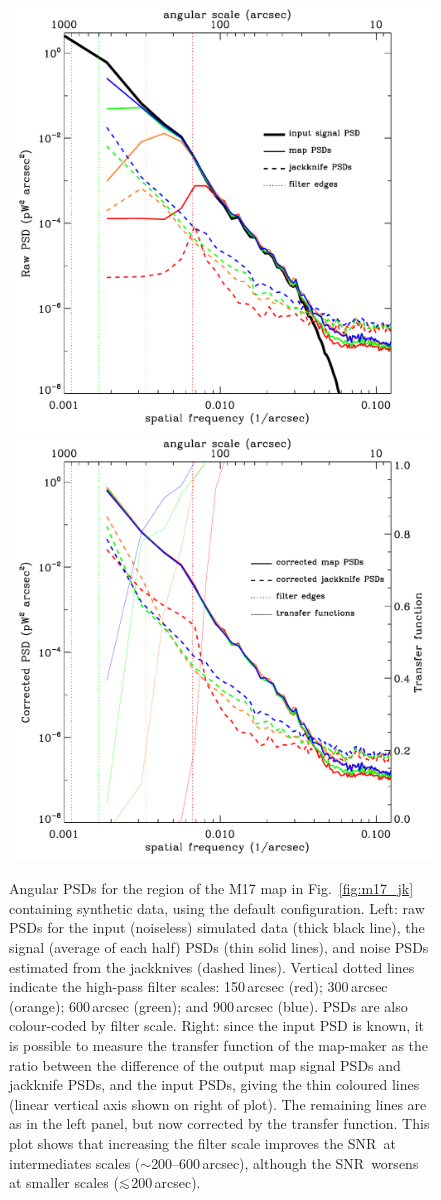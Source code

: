 \documentclass[useAMS,usenatbib,nofootinbib]{mn2e}
\newcommand{\snr}{SNR}
\def\lsim{\mathrel{\lower2.5pt\vbox{\lineskip=0pt\baselineskip=0pt
          \hbox{$<$}\hbox{$\sim$}}}}
\begin{document}
\begin{figure}
\centering
\includegraphics[width=0.49\linewidth]{pspec_m17_default}
\includegraphics[width=0.49\linewidth]{cor_pspec_m17_default}
\caption{Angular PSDs for the region of the M17 map in
Fig.~\ref{fig:m17_jk} containing synthetic data, using the default
configuration. Left: raw PSDs for the input (noiseless) simulated data
(thick black line), the signal (average of each half) PSDs (thin solid
lines), and noise PSDs estimated from the jackknives (dashed
lines). Vertical dotted lines indicate the high-pass filter scales:
150\,arcsec (red); 300\,arcsec (orange); 600\,arcsec (green); and
900\,arcsec (blue). PSDs are also colour-coded by filter scale. Right:
since the input PSD is known, it is possible to measure the transfer
function of the map-maker as the ratio between the difference of the
output map signal PSDs and jackknife PSDs, and the input PSDs, giving
the thin coloured lines (linear vertical axis shown on right of
plot). The remaining lines are as in the left panel, but now corrected
by the transfer function. This plot shows that increasing the filter
scale improves the \snr\ at intermediates scales
($\sim$200--600\,arcsec), although the \snr\ worsens at smaller scales
($\lsim$200\,arcsec).}
\label{fig:m17_def_ps}
\end{figure}
\end{document}
